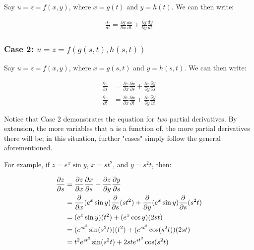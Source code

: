 \documentclass[12pt]{article}
\begin{document}
Say $u = z = f(x,y)$, where $x = g(t)$ and $y = h(t)$. We can then write:

\begin{equation}
    \begin{split}
        \frac{dz}{dt} = \frac{\partial f}{\partial x} \frac{dx}{dt} + \frac{\partial f}{\partial y}\frac{dy}{dt}
    \end{split}
\end{equation}

\subsubsection*{\texorpdfstring{Case 2: $u=z=f(g(s,t),h(s,t))$}{A function of two parametrically defined functions in terms of two variables}}

Say $u = z = f(x,y)$, where $x = g(s,t)$ and $y = h(s,t)$. We can then write:

\begin{equation}
    \begin{split}
        \frac{\partial z}{\partial s}&=\frac{\partial z}{\partial x} \frac{\partial x}{\partial s}+\frac{\partial z}{\partial y} \frac{\partial y}{\partial s}\\
        \frac{\partial z}{\partial t}&=\frac{\partial z}{\partial x} \frac{\partial x}{\partial t}+\frac{\partial z}{\partial y} \frac{\partial y}{\partial t}
    \end{split}
\end{equation}

Notice that Case 2 demonstrates the equation for \textit{two} partial derivatives. By extension, the more variables that $u$ is a function of, the more partial derivatives there will be; in this situation, further "cases" simply follow the general aforementioned. 

For example, if $z = e^x \sin y$, $x = st^2$, and $y = s^2t$, then:

\begin{equation}
    \begin{split}
        \frac{\partial z}{\partial s} &= \frac{\partial z}{\partial x} \frac{\partial x}{\partial s} + \frac{\partial z}{\partial y} \frac{\partial y}{\partial s}\\
        &= \frac{\partial }{\partial x}(e^x \sin y) \frac{\partial }{\partial s}(st^2) + \frac{\partial }{\partial y}(e^x \sin y) \frac{\partial }{\partial s}(s^2t)\\
        &= (e^x \sin y)(t^2) + (e^x \cos y)(2st)\\
        &= (e^{st^2} \sin(s^2t))(t^2) + (e^{st^2} \cos(s^2t))(2st)\\
        &= t^2 e^{s t^2} \sin(s^2 t)+2 s t e^{s t^2} \cos(s^2 t)
    \end{split}
\end{equation}
\end{document}
